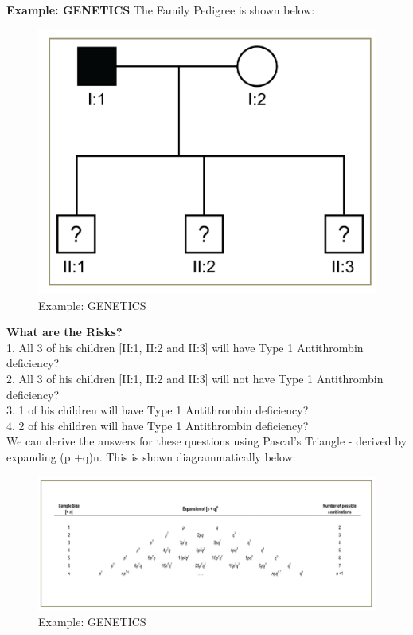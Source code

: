 \textbf{Example: GENETICS}
The Family Pedigree is shown below: \\

\begin{figure}
    \centering
    \includegraphics[width=0.5\linewidth]{1 Introducción/Tareas Capítulo 1/Triángulo de Pascal/Picture2.png}
    \caption{Example: GENETICS}
    \label{fig:enter-label}
\end{figure}

\textbf{What are the Risks?} \\
1. All 3 of his children [II:1, II:2 and II:3] will have Type 1 Antithrombin deficiency? \\

2. All 3 of his children [II:1, II:2 and II:3] will not have Type 1 Antithrombin deficiency? \\

3. 1 of his children will have Type 1 Antithrombin deficiency? \\

4. 2 of his children will have Type 1 Antithrombin deficiency? \\

We can derive the answers for these questions using Pascal's Triangle - derived by expanding (p +q)n. This is shown diagrammatically below: \\

\begin{figure}
    \centering
    \includegraphics[width=1\linewidth]{1 Introducción/Tareas Capítulo 1/Triángulo de Pascal/Picture3.png}
    \caption{Example: GENETICS}
    \label{fig:enter-label}
\end{figure}

